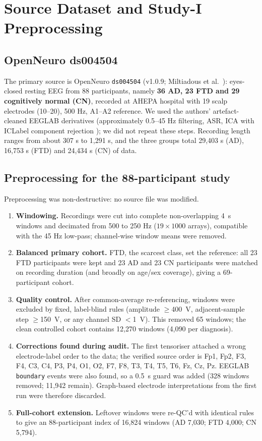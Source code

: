\documentclass[10pt,twocolumn,a4paper]{article}
\newcommand{\code}[1]{\texttt{\small #1}}
\begin{document}
\section{Source Dataset and Study-I Preprocessing}
\label{sec:source}
\subsection{OpenNeuro ds004504}
\label{sec:opn}
The primary source is OpenNeuro \code{ds004504} (v1.0.9; Miltiadous et al.~\cite{miltiadous2023}): eyes-closed resting EEG from 88 participants, namely \textbf{36 AD, 23 FTD and 29 cognitively normal (CN)}, recorded at AHEPA hospital with 19 scalp electrodes (10--20), 500 Hz, A1--A2 reference. We used the authors' artefact-cleaned EEGLAB derivatives (approximately 0.5--45 Hz filtering, ASR, ICA with ICLabel component rejection \cite{pion2019}); we did not repeat these steps. Recording length ranges from about 307 s to 1,291 s, and the three groups total 29,403 s (AD), 16,753 s (FTD) and 24,434 s (CN) of data.

\subsection{Preprocessing for the 88-participant study}
\label{sec:study1prep}
Preprocessing was non-destructive: no source file was modified.
\begin{enumerate}[label=(\arabic*)]
\item \textbf{Windowing.} Recordings were cut into complete non-overlapping 4~s windows and decimated from 500 to 250 Hz ($19{\times}1000$ arrays), compatible with the 45 Hz low-pass; channel-wise window means were removed.
\item \textbf{Balanced primary cohort.} FTD, the scarcest class, set the reference: all 23 FTD participants were kept and 23 AD and 23 CN participants were matched on recording duration (and broadly on age/sex coverage), giving a 69-participant cohort.
\item \textbf{Quality control.} After common-average re-referencing, windows were excluded by fixed, label-blind rules (amplitude $\ge$400~\textmu V, adjacent-sample step $\ge$150~\textmu V, or any channel SD $<$1~\textmu V). This removed 65 windows; the clean controlled cohort contains 12,270 windows (4,090 per diagnosis).
\item \textbf{Corrections found during audit.} The first tensoriser attached a wrong electrode-label order to the data; the verified source order is Fp1, Fp2, F3, F4, C3, C4, P3, P4, O1, O2, F7, F8, T3, T4, T5, T6, Fz, Cz, Pz. EEGLAB \code{boundary} events were also found, so a 0.5~s guard was added (328 windows removed; 11,942 remain). Graph-based electrode interpretations from the first run were therefore discarded.
\item \textbf{Full-cohort extension.} Leftover windows were re-QC'd with identical rules to give an 88-participant index of 16,824 windows (AD 7,030; FTD 4,000; CN 5,794).
\end{enumerate}
\end{document}

